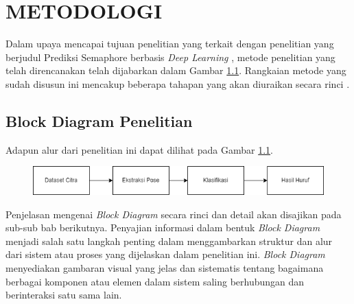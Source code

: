 \chapter{METODOLOGI}


Dalam upaya mencapai tujuan penelitian yang terkait dengan penelitian yang berjudul Prediksi Semaphore berbasis \textit{Deep Learning }, metode penelitian yang telah direncanakan telah dijabarkan dalam Gambar \ref{fig:blokdiagram}. Rangkaian metode yang sudah disusun ini mencakup beberapa tahapan yang akan diuraikan secara rinci .

\section{Block Diagram Penelitian}
Adapun alur dari penelitian ini dapat dilihat pada Gambar \ref{fig:blokdiagram}.
\begin{figure}[hbt!]
	\includegraphics[width=1.0\linewidth]{gambar/metodologi_kerja.png}
	\label{fig:blokdiagram}
\end{figure}
Penjelasan mengenai \textit{Block Diagram} secara rinci dan detail akan disajikan pada sub-sub bab berikutnya. Penyajian informasi dalam bentuk \textit{Block Diagram} menjadi salah satu langkah penting dalam menggambarkan struktur dan alur dari sistem atau proses yang dijelaskan dalam penelitian ini. \textit{Block Diagram} menyediakan gambaran visual yang jelas dan sistematis tentang bagaimana berbagai komponen atau elemen dalam sistem saling berhubungan dan berinteraksi satu sama lain.

